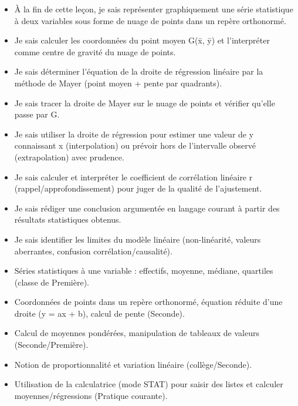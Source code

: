 \documentclass[11pt]{article}
\begin{document}
\begin{objectifs}
\begin{itemize}
\item À la fin de cette leçon, je sais représenter graphiquement une série statistique à deux variables sous forme de nuage de points dans un repère orthonormé.
\item Je sais calculer les coordonnées du point moyen G(x̄, ȳ) et l'interpréter comme centre de gravité du nuage de points.
\item Je sais déterminer l'équation de la droite de régression linéaire par la méthode de Mayer (point moyen + pente par quadrants).
\item Je sais tracer la droite de Mayer sur le nuage de points et vérifier qu'elle passe par G.
\item Je sais utiliser la droite de régression pour estimer une valeur de y connaissant x (interpolation) ou prévoir hors de l'intervalle observé (extrapolation) avec prudence.
\item Je sais calculer et interpréter le coefficient de corrélation linéaire r (rappel/approfondissement) pour juger de la qualité de l'ajustement.
\item Je sais rédiger une conclusion argumentée en langage courant à partir des résultats statistiques obtenus.
\item Je sais identifier les limites du modèle linéaire (non-linéarité, valeurs aberrantes, confusion corrélation/causalité).
\end{itemize}
\end{objectifs}

\begin{prerequis}
\begin{itemize}
\item Séries statistiques à une variable : effectifs, moyenne, médiane, quartiles (classe de Première).
\item Coordonnées de points dans un repère orthonormé, équation réduite d'une droite (y = ax + b), calcul de pente (Seconde).
\item Calcul de moyennes pondérées, manipulation de tableaux de valeurs (Seconde/Première).
\item Notion de proportionnalité et variation linéaire (collège/Seconde).
\item Utilisation de la calculatrice (mode STAT) pour saisir des listes et calculer moyennes/régressions (Pratique courante).
\end{itemize}
\end{prerequis}
\end{document}
